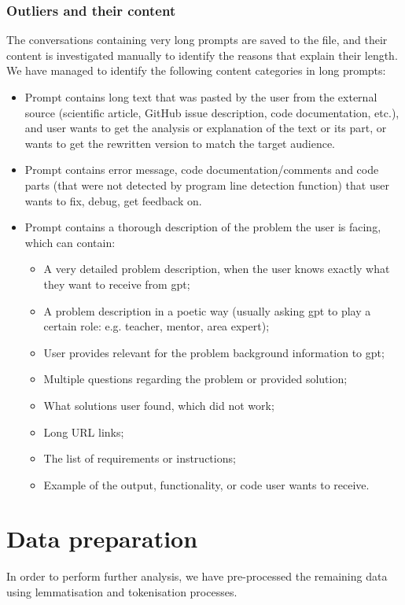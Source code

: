 \subsubsection{Outliers and their content}
The conversations containing very long prompts are saved to the file, and their content is investigated manually to identify the reasons that explain their length. We have managed to identify the following content categories in long prompts:
\begin{itemize}
    \item Prompt contains long text that was pasted by the user from the external source (scientific article, GitHub issue description, code documentation, etc.), and user wants to get the analysis or explanation of the text or its part, or wants to get the rewritten version to match the target audience.
    \item Prompt contains error message, code documentation/comments and code parts (that were not detected by program line detection function) that user wants to fix, debug, get feedback on.
    \item Prompt contains a thorough description of the problem the user is facing, which can contain:
    \begin{itemize}
        \item A very detailed problem description, when the user knows exactly what they want to receive from \gls{gpt};
        \item A problem description in a poetic way (usually asking \gls{gpt} to play a certain role: e.g. teacher, mentor, area expert);
        \item User provides relevant for the problem background information to \gls{gpt};
        \item Multiple questions regarding the problem or provided solution; 
        \item What solutions user found, which did not work;
        \item Long URL links;
        \item The list of requirements or instructions;
        \item Example of the output, functionality, or code user wants to receive.
    \end{itemize}
\end{itemize}

\section{Data preparation} \label{sec:data-prep}
In order to perform further analysis, we have pre-processed the remaining data using lemmatisation and tokenisation processes.  

